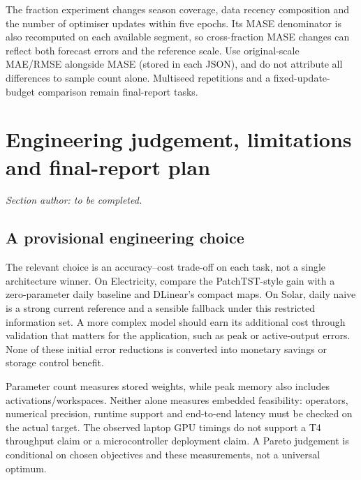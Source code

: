 \documentclass[10pt,a4paper]{article}
\begin{document}
The fraction experiment changes season coverage, data recency composition and the number of optimiser updates within five epochs. Its MASE denominator is also recomputed on each available segment, so cross-fraction MASE changes can reflect both forecast errors and the reference scale. Use original-scale MAE/RMSE alongside MASE (stored in each JSON), and do not attribute all differences to sample count alone. Multiseed repetitions and a fixed-update-budget comparison remain final-report tasks.

\clearpage
\section{Engineering judgement, limitations and final-report plan}
\noindent\textit{Section author: to be completed.}


\subsection{A provisional engineering choice}
The relevant choice is an accuracy--cost trade-off on each task, not a single architecture winner. On Electricity, compare the PatchTST-style gain with a zero-parameter daily baseline and DLinear's compact maps. On Solar, daily naive is a strong current reference and a sensible fallback under this restricted information set. A more complex model should earn its additional cost through validation that matters for the application, such as peak or active-output errors. None of these initial error reductions is converted into monetary savings or storage control benefit.

Parameter count measures stored weights, while peak memory also includes activations/workspaces. Neither alone measures embedded feasibility: operators, numerical precision, runtime support and end-to-end latency must be checked on the actual target. The observed laptop GPU timings do not support a T4 throughput claim or a microcontroller deployment claim. A Pareto judgement is conditional on chosen objectives and these measurements, not a universal optimum.
\end{document}
